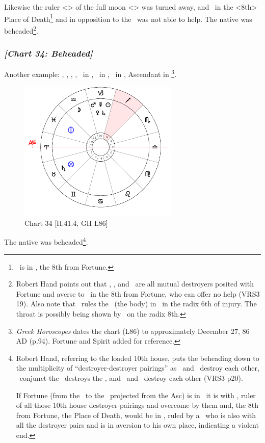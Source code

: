 Likewise the ruler <\Saturn> of the full moon <\Capricorn> was turned away, and \Jupiter\, in the <8th> Place of Death\footnote{\Jupiter\, is in \Capricorn, the 8th from Fortune.} and in opposition to the \Sun\, was not able to help. The native was beheaded\footnote{Robert Hand points out that \Mercury, \Mars, and \Saturn\, are all mutual destroyers posited with Fortune and averse to \Jupiter\, in the 8th from Fortune, who can offer no help (VRS3 19). Also note that \Jupiter\, rules the \Moon\, (the body) in \Pisces\, in the radix 6th of injury. The throat is possibly being shown by \Taurus\, on the radix 8th.}.
\newpage
\subsubsection{\textit{[Chart 34: Beheaded]}}
Another example: \Sun, \Mercury, \Mars, \Jupiter, \Venus\, in \Capricorn, \Moon\, in \Aquarius, \Saturn\, in \Taurus, Ascendant in \Aries
\footnote{\textit{Greek Horoscopes} dates the chart (L86) to approximately December 27, 86 AD (p.94). Fortune and Spirit added for reference.}.

\clearpage
\begin{figure}
\centering
\vspace{-20pt}
\includegraphics[width=0.68\textwidth]{charts/2_41_4}
\caption{Chart 34 [II.41.4, GH L86]}
\label{fig:chart34}
\end{figure} 

The native was beheaded\footnote{Robert Hand, referring to the loaded 10th house, puts the beheading down to the multiplicity of ``destroyer-destroyer pairings'' as  \Jupiter\, and \Venus\, destroy each other, \Jupiter\, conjunct the \Sun\, destroys the \Sun, and \Mercury\, and \Mars\, destroy each other (VRS3 p20).
  
If Fortune (from the \Sun\, to the \Moon\, projected from the Asc) is in \Taurus\, it is with \Saturn, ruler of all those 10th house destroyer-pairings and overcome by them and, the 8th from Fortune, the Place of Death, would be in \Sagittarius, ruled by a \Jupiter\, who is also with all the destroyer pairs and is in aversion to his own place, indicating a violent end.}.
\newpage
